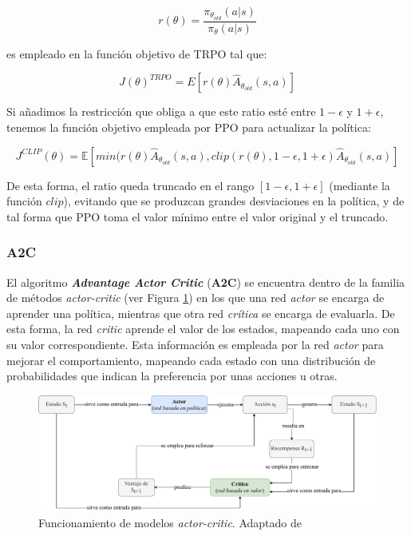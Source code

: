 \begin{equation}
    r(\theta) = \frac{\pi_{\theta_ {old}}(a|s)}{\pi_\theta(a|s)}
\end{equation}

es empleado en la función objetivo de TRPO tal que:

\begin{equation}
    J(\theta)^{TRPO} = E[r(\theta) \hat{A}_{\theta_{old}}(s,a)]
\end{equation}

Si añadimos la restricción que obliga a que este ratio esté entre $1-\epsilon$ y $1+\epsilon$, tenemos la función objetivo empleada por PPO para actualizar la política:

\begin{equation}
    J^{CLIP}(\theta) = \mathds{E}[min(r(\theta)\hat{A}_{\theta_{old}}(s,a), clip(r(\theta), 1-\epsilon, 1+\epsilon)\hat{A}_{\theta_{old}}(s,a)]
\end{equation}

De esta forma, el ratio queda truncado en el rango $[1-\epsilon, 1+\epsilon]$ (mediante la función $clip$), evitando que se produzcan grandes desviaciones en la política, y de tal forma que PPO toma el valor mínimo entre el valor original y el truncado.

\subsubsection{A2C}

El algoritmo \textbf{\textit{Advantage Actor Critic}} (\textbf{A2C}) se encuentra dentro de la familia de métodos \textit{actor-critic} (ver Figura \ref{fig:actor-critic}) en los que una red \textit{actor} se encarga de aprender una política, mientras que otra red  \textit{crítica} se encarga de evaluarla. De esta forma, la red \textit{critic} aprende el valor de los estados, mapeando cada uno con su valor correspondiente. Esta información es empleada por la red \textit{actor} para mejorar el comportamiento, mapeando cada estado con una distribución de probabilidades que indican la preferencia por unas acciones u otras.

\begin{figure}
    \centering
    \includegraphics[width=\textwidth]{imagenes/actor-critic.pdf}
    \caption{Funcionamiento de modelos \textit{actor-critic}. Adaptado de \cite{zai2020deep}}
    \label{fig:actor-critic}
\end{figure}

